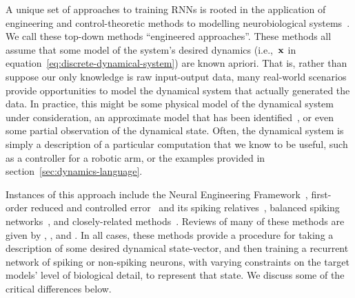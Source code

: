 A unique set of approaches to training RNNs is rooted in the application of engineering and control-theoretic methods to modelling neurobiological systems~\citep{eliasmith1999developing}.
We call these top-down methods ``engineered approaches''.
These methods all assume that some model of the system's desired dynamics (i.e.,~$\mathbf{x}$ in equation~\ref{eq:discrete-dynamical-system}) are known apriori.
That is, rather than suppose our only knowledge is raw input-output data, many real-world scenarios provide opportunities to model the dynamical system that actually generated the data.
In practice, this might be some physical model of the dynamical system under consideration, an approximate model that has been identified~\citep{nelles2013nonlinear}, or even some partial observation of the dynamical state.
Often, the dynamical system is simply a description of a particular computation that we know to be useful, such as a controller for a robotic arm, or the examples provided in section~\ref{sec:dynamics-language}.

Instances of this approach include the Neural Engineering Framework~\citep[NEF;][]{eliasmith2003a, duggins2017incorporating}, first-order reduced and controlled error~\citep[FORCE;][]{sussillo2009generating, depasquale2018full} and its spiking relatives~\citep{thalmeier2016learning, depasquale2016using}, balanced spiking networks~\citep{boerlin2011spike, boerlin2013predictive, schwemmer2015constructing, alemi2018learning}, and closely-related methods~\citep{jaeger2014controlling, gilra2017predicting}.
Reviews of many of these methods are given by \citet{deneve2016efficient}, \citet{abbott2016building}, and \citet{nicola2016supervised}.
In all cases, these methods provide a procedure for taking a description of some desired dynamical state-vector, and then training a recurrent network of spiking or non-spiking neurons, with varying constraints on the target models' level of biological detail, to represent that state.
We discuss some of the critical differences below.


